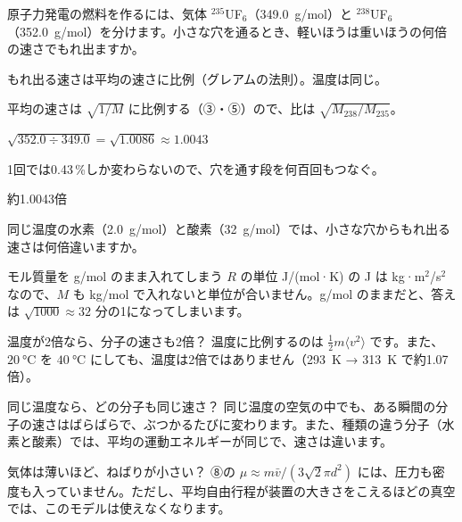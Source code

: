 \begin{reidai}
\label{ph:熱-14:ex12}原子力発電の燃料を作るには、気体 $^{235}$UF$_6$（\qty{349.0}{g/mol}）と $^{238}$UF$_6$（\qty{352.0}{g/mol}）を分けます。小さな穴を通るとき、軽いほうは重いほうの何倍の速さでもれ出ますか。
\par{} もれ出る速さは平均の速さに比例（グレアムの法則）。温度は同じ。
\par\kangaekata 平均の速さは $\sqrt{1/M}$ に比例する（③・⑤）ので、比は $\sqrt{M_{238}/M_{235}}$。
\par\shiki $\sqrt{352.0\div349.0}=\sqrt{1.0086}\approx1.0043$
\par{} 1回では0.43\,\%しか変わらないので、穴を通す段を何百回もつなぐ。
\par\kotae 約1.0043倍
\end{reidai}
\begin{jibun}
同じ温度の水素（\qty{2.0}{g/mol}）と酸素（\qty{32}{g/mol}）では、小さな穴からもれ出る速さは何倍違いますか。
\end{jibun}

\begin{tsumazuki}{モル質量を g/mol のまま入れてしまう}
$R$ の単位 J/(mol·K) の J は kg·m$^2$/s$^2$ なので、$M$ も kg/mol で入れないと単位が合いません。g/mol のままだと、答えは $\sqrt{1000}\approx32$ 分の1になってしまいます。
\end{tsumazuki}
\begin{tsumazuki}{温度が2倍なら、分子の速さも2倍？}
温度に比例するのは $\tfrac12m\langle v^2\rangle$ です。また、$\qty{20}{\celsius}$ を $\qty{40}{\celsius}$ にしても、温度は2倍ではありません（\qty{293}{K} → \qty{313}{K} で約1.07倍）。
\end{tsumazuki}
\begin{tsumazuki}{同じ温度なら、どの分子も同じ速さ？}
同じ温度の空気の中でも、ある瞬間の分子の速さはばらばらで、ぶつかるたびに変わります。また、種類の違う分子（水素と酸素）では、平均の運動エネルギーが同じで、速さは違います。
\end{tsumazuki}
\begin{tsumazuki}{気体は薄いほど、ねばりが小さい？}
⑧の $\mu\approx m\bar v/(3\sqrt2\pi d^2)$ には、圧力も密度も入っていません。ただし、平均自由行程が装置の大きさをこえるほどの真空では、このモデルは使えなくなります。
\end{tsumazuki}

